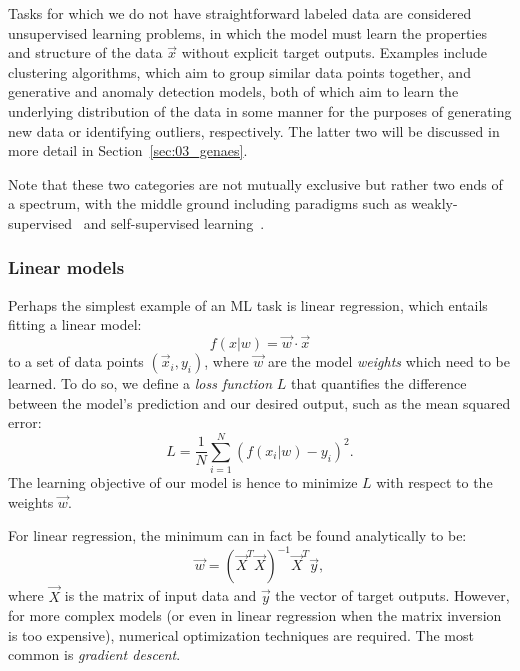 Tasks for which we do not have straightforward labeled data are considered unsupervised learning problems, in which the model must learn the properties and structure of the data $\vec{x}$ without explicit target outputs.
Examples include clustering algorithms, which aim to group similar data points together, and generative and anomaly detection models, both of which aim to learn the underlying distribution of the data in some manner for the purposes of generating new data or identifying outliers, respectively.
The latter two will be discussed in more detail in Section~\ref{sec:03_genaes}.

Note that these two categories are not mutually exclusive but rather two ends of a spectrum, with the middle ground including paradigms such as weakly-supervised~\cite{chapelle2006semisupervised} and self-supervised learning~\cite{balestriero2023cookbookselfsupervisedlearning}.

\subsubsection{Linear models}

Perhaps the simplest example of an ML task is linear regression, which entails fitting a linear model:
\begin{equation}
    \label{eq:03_ml_linear}
    f(x|w) = \vec{w} \cdot \vec{x}
\end{equation}
to a set of data points $(\vec{x}_i, y_i)$, where $\vec{w}$ are the model \textit{weights} which need to be learned.
To do so, we define a \textit{loss function} $L$ that quantifies the difference between the model's prediction and our desired output, such as the mean squared error:
\begin{equation}
    \label{eq:03_ml_mse}
    L = \frac{1}{N} \sum_{i=1}^N (f(x_i|w) - y_i)^2.
\end{equation}
The learning objective of our model is hence to minimize $L$ with respect to the weights $\vec{w}$.

For linear regression, the minimum can in fact be found analytically to be:
\begin{equation}
    \label{eq:03_ml_linear_soln}
    \vec{w} = (\vec{X}^T \vec{X})^{-1} \vec{X}^T \vec{y},
\end{equation}
where $\vec{X}$ is the matrix of input data and $\vec{y}$ the vector of target outputs.
However, for more complex models (or even in linear regression when the matrix inversion is too expensive), numerical optimization techniques are required.
The most common is \textit{gradient descent}.

